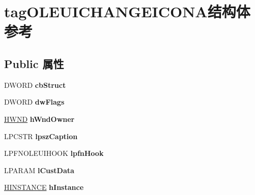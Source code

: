 \hypertarget{structtag_o_l_e_u_i_c_h_a_n_g_e_i_c_o_n_a}{}\section{tag\+O\+L\+E\+U\+I\+C\+H\+A\+N\+G\+E\+I\+C\+O\+N\+A结构体 参考}
\label{structtag_o_l_e_u_i_c_h_a_n_g_e_i_c_o_n_a}
\subsection*{Public 属性}
\begin{DoxyCompactItemize}
\item 
\mbox{\label{structtag_o_l_e_u_i_c_h_a_n_g_e_i_c_o_n_a_a58c86173ed1dded542600a3e02bf975c}} 
D\+W\+O\+RD {\bfseries cb\+Struct}
\item 
\mbox{\label{structtag_o_l_e_u_i_c_h_a_n_g_e_i_c_o_n_a_a93cd3b922afc00888235c22edfe25a21}} 
D\+W\+O\+RD {\bfseries dw\+Flags}
\item 
\mbox{\label{structtag_o_l_e_u_i_c_h_a_n_g_e_i_c_o_n_a_a0b4836b8a59de922db3e1ce8f873230b}} 
\hyperlink{interfacevoid}{H\+W\+ND} {\bfseries h\+Wnd\+Owner}
\item 
\mbox{\label{structtag_o_l_e_u_i_c_h_a_n_g_e_i_c_o_n_a_a5edee7998b01c4699066367ca0a73ae5}} 
L\+P\+C\+S\+TR {\bfseries lpsz\+Caption}
\item 
\mbox{\label{structtag_o_l_e_u_i_c_h_a_n_g_e_i_c_o_n_a_aef98fe7f5a3fe09ac394e2c5bb8b9e87}} 
L\+P\+F\+N\+O\+L\+E\+U\+I\+H\+O\+OK {\bfseries lpfn\+Hook}
\item 
\mbox{\label{structtag_o_l_e_u_i_c_h_a_n_g_e_i_c_o_n_a_a2f5d1773fd52884e6df6c640baab290a}} 
L\+P\+A\+R\+AM {\bfseries l\+Cust\+Data}
\item 
\mbox{\label{structtag_o_l_e_u_i_c_h_a_n_g_e_i_c_o_n_a_ad6f4b4d42ce8f2215db8807eeb907cf3}} 
\hyperlink{interfacevoid}{H\+I\+N\+S\+T\+A\+N\+CE} {\bfseries h\+Instance}

\end{DoxyCompactItemize}
